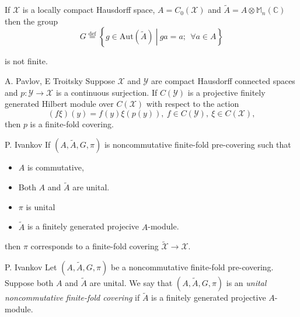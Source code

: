 \documentclass{beamer}
\theoremstyle{plain}
\newcommand{\be}{\begin{equation}}
\newcommand{\ee}{\end{equation}}
\newcommand{\Aut}{\mathrm{Aut}}
\newcommand{\bydef}{\stackrel{\mathrm{def}}{=}}
\begin{document}
\begin{frame}
\begin{example}
If $\mathcal{X}$ is a locally compact Hausdorff space, $A = C_0\left(\mathcal{X}\right)$ and $\widetilde{A}= A\otimes \mathbb{M}_n\left(\mathbb{C} \right)$ then the group
			\be\nonumber
G \bydef \left\{ \left.g \in \Aut\left(\widetilde{A} \right)~\right|~ ga = a;~~\forall a \in A\right\}
\ee

is not finite.
\end{example}
	\begin{theorem}\alert{A. Pavlov, E Troitsky}
		Suppose $\mathcal X$ and $\mathcal Y$ are compact Hausdorff connected spaces and $p :\mathcal  Y \to \mathcal X$
is a continuous surjection. If $C(\mathcal Y )$ is a projective finitely generated Hilbert module over
$C(\mathcal X)$ with respect to the action
\begin{equation*}
(f\xi)(y) = f(y)\xi(p(y)), ~ f \in  C(\mathcal Y ), ~ \xi \in  C(\mathcal X),
\end{equation*}
then $p$ is a finite-fold  covering.
	\end{theorem}
\end{frame}
\begin{frame}
	
\begin{corollary}\alert{P. Ivankov}
	If $\left(A, \widetilde{A}, G, \pi \right)$ is noncommutative finite-fold  pre-covering such that
	\begin{itemize}
		\item $A$ is commutative,
		\item Both $A$ and $\widetilde{A}$ are unital.
		\item $\pi$ is unital 
	\item $\widetilde{A}$	is a finitely generated projecive $A$-module.
	\end{itemize}
	then $\pi$ corresponds to a finite-fold covering $ \widetilde{\mathcal  X}\to \mathcal  X$.
\end{corollary}
\begin{definition}
	\alert{P. Ivankov}
	  	Let $\left(A, \widetilde{A}, G, \pi \right)$ be a  noncommutative finite-fold  pre-covering. Suppose both $A$ and  $\widetilde{A}$ are unital. We say that $\left(A, \widetilde{A}, G, \pi \right)$ is an \textit{unital noncommutative finite-fold  covering} if $\widetilde{A}$ is a finitely generated projective  $A$-module.
\end{definition}
\end{frame}
\end{document}
